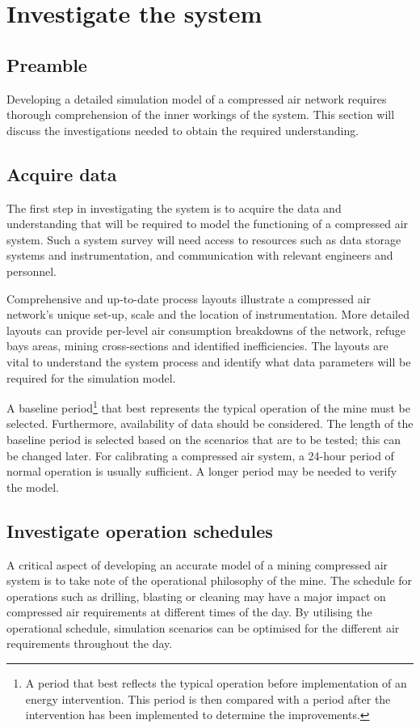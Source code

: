 \section{Investigate the system}
	\subsection{Preamble}
		Developing a detailed simulation model of a compressed air network requires thorough comprehension of the inner workings of the system. This section will discuss the investigations needed to obtain the required understanding.
		\clearpage
	\subsection{Acquire data} %
	The first step in investigating the system is to acquire the data and understanding that will be required to model the functioning of a compressed air system. Such a system survey will need access to resources such as data storage systems and instrumentation, and communication with relevant engineers and personnel.
	\par 
	Comprehensive and up-to-date process layouts illustrate a compressed air network's unique set-up, scale and the location of instrumentation. More detailed layouts can provide per-level air consumption breakdowns of the network, refuge bays areas, mining cross-sections and identified inefficiencies. The layouts are vital to understand the system process and identify what data parameters will be required for the simulation model. 
	\par 
	A baseline period\footnote{A period that best reflects the typical operation before implementation of an energy intervention. This period is then compared with a period after the intervention has been implemented to determine the improvements.} that best represents the typical operation of the mine must be selected. Furthermore, availability of data should be considered. The length of the baseline period is selected based on the scenarios that are to be tested; this can be changed later. For calibrating a compressed air system, a 24-hour period of normal operation is usually sufficient. A longer period may be needed to verify the model. 

	\subsection{Investigate operation schedules}
	A critical aspect of developing an accurate model of a mining compressed air system is to take note of the operational philosophy of the mine. The schedule for operations such as drilling, blasting or cleaning may have a major impact on compressed air requirements at different times of the day. By utilising the operational schedule, simulation scenarios can be optimised for the different air requirements throughout the day.	
	
